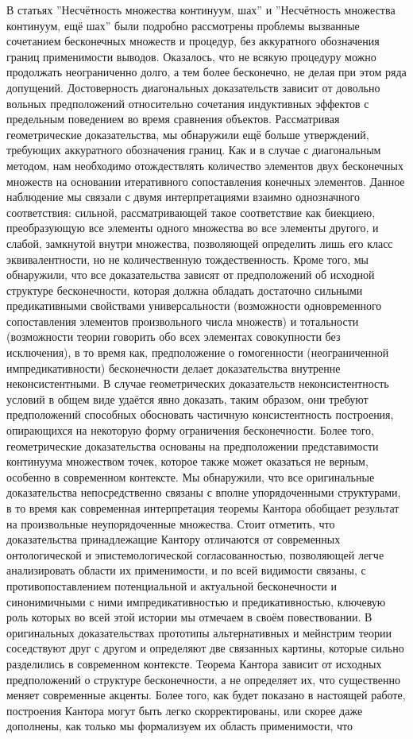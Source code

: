 \documentclass[12pt]{article}
\begin{document}
В статьях ''Несчётность множества континуум, шах'' и ''Несчётность множества континуум, ещё шах'' были подробно рассмотрены проблемы вызванные сочетанием бесконечных множеств и процедур, без аккуратного обозначения границ применимости выводов. Оказалось, что не всякую процедуру можно продолжать неограниченно долго, а тем более бесконечно, не делая при этом ряда допущений. Достоверность диагональных доказательств зависит от довольно вольных предположений относительно сочетания индуктивных эффектов с предельным поведением во время сравнения объектов. Рассматривая геометрические доказательства, мы обнаружили ещё больше утверждений, требующих аккуратного обозначения границ. Как и в случае с диагональным методом, нам необходимо отождествлять количество элементов двух бесконечных множеств на основании итеративного сопоставления конечных элементов. Данное наблюдение мы связали с двумя интерпретациями взаимно однозначного соответствия: сильной, рассматривающей такое соответствие как биекциею, преобразующую все элементы одного множества во все элементы другого, и слабой, замкнутой внутри множества, позволяющей определить лишь его класс эквивалентности, но не количественную тождественность. Кроме того, мы обнаружили, что все доказательства зависят от предположений об исходной структуре бесконечности, которая должна обладать достаточно сильными предикативными свойствами универсальности (возможности одновременного сопоставления элементов произвольного числа множеств) и тотальности (возможности теории говорить обо всех элементах совокупности без исключения), в то время как, предположение о гомогенности (неограниченной импредикативности) бесконечности делает доказательства внутренне неконсистентными. В случае геометрических доказательств неконсистентность условий в общем виде удаётся явно доказать, таким образом, они требуют предположений способных обосновать частичную консистентность построения, опирающихся на некоторую форму ограничения бесконечности. Более того, геометрические доказательства основаны на предположении представимости континуума множеством точек, которое также может оказаться не верным, особенно в современном контексте. Мы обнаружили, что все оригинальные доказательства непосредственно связаны с вполне упорядоченными структурами, в то время как современная интерпретация теоремы Кантора обобщает результат на произвольные неупорядоченные множества. Стоит отметить, что доказательства принадлежащие Кантору отличаются от современных онтологической и эпистемологической согласованностью, позволяющей легче анализировать области их применимости, и по всей видимости связаны, с противопоставлением потенциальной и актуальной бесконечности и синонимичными с ними импредикативностью и предикативностью, ключевую роль которых во всей этой истории мы отмечаем в своём повествовании. В оригинальных доказательствах прототипы альтернативных и мейнстрим теории соседствуют друг с другом и определяют две связанных картины, которые сильно разделились в современном контексте. Теорема Кантора зависит от исходных предположений о структуре бесконечности, а не определяет их, что существенно меняет современные акценты. Более того, как будет показано в настоящей работе, построения Кантора могут быть легко скорректированы, или скорее даже дополнены, как только мы формализуем их область применимости, что 
\end{document}
